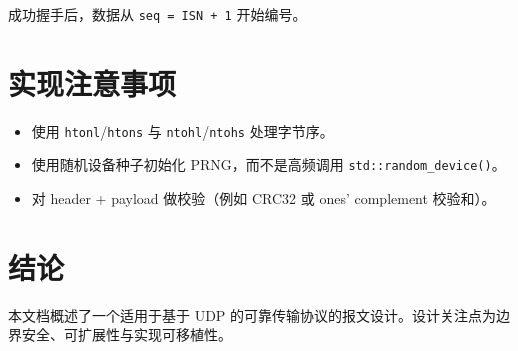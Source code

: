 \documentclass[11pt,a4paper]{article}
\begin{document}
成功握手后，数据从 \texttt{seq = ISN + 1} 开始编号。

\section{实现注意事项}
\begin{itemize}
  \item 使用 \texttt{htonl}/\texttt{htons} 与 \texttt{ntohl}/\texttt{ntohs} 处理字节序。
  \item 使用随机设备种子初始化 PRNG，而不是高频调用 \texttt{std::random_device()}。
  \item 对 header + payload 做校验（例如 CRC32 或 ones' complement 校验和）。
\end{itemize}

\section{结论}
本文档概述了一个适用于基于 UDP 的可靠传输协议的报文设计。设计关注点为边界安全、可扩展性与实现可移植性。
\end{document}
